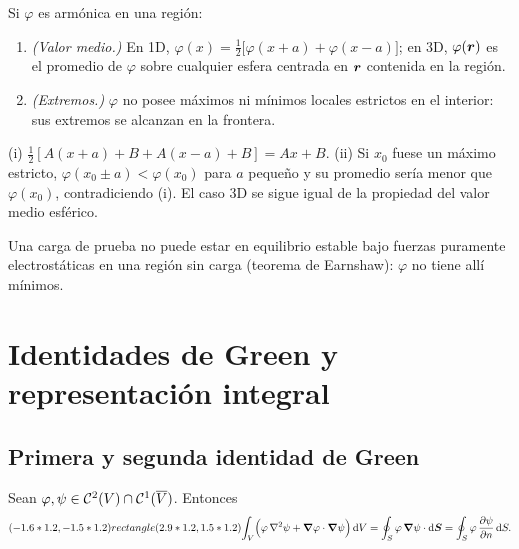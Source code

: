 \documentclass[11pt,a4paper,twoside]{article}
\begin{document}
\begin{proposicion}\label{prop:valormedio}
Si $\varphi$ es armónica en una región:
\begin{enumerate}
  \item \emph{(Valor medio.)} En 1D, $\varphi(x)=\tfrac12\bigl[\varphi(x+a)+\varphi(x-a)\bigr]$;
  en 3D, $\varphi(\bm{r})$ es el promedio de $\varphi$ sobre cualquier esfera centrada en $\bm{r}$
  contenida en la región.
  \item \emph{(Extremos.)} $\varphi$ no posee máximos ni mínimos locales estrictos en el
  interior: sus extremos se alcanzan en la frontera.
\end{enumerate}
\end{proposicion}

\begin{demostracion}[(caso 1D)]
(i) $\tfrac12[A(x+a)+B+A(x-a)+B]=Ax+B$. (ii) Si $x_0$ fuese un máximo estricto,
$\varphi(x_0\pm a)<\varphi(x_0)$ para $a$ pequeño y su promedio sería menor que
$\varphi(x_0)$, contradiciendo (i). El caso 3D se sigue igual de la propiedad del valor medio
esférico.
\end{demostracion}

\begin{observacion}
Una carga de prueba no puede estar en equilibrio estable bajo fuerzas puramente
electrostáticas en una región sin carga (teorema de Earnshaw): $\varphi$ no tiene allí mínimos.
\end{observacion}

\section{Identidades de Green y representación integral}

\subsection{Primera y segunda identidad de Green}

\begin{teorema}\label{teo:green1}
Sean $\varphi,\psi\in\mathcal{C}^{2}(V)\cap\mathcal{C}^{1}(\overline V)$. Entonces
\begin{equation}\label{eq:green1}
  (-1.6*1.2,-1.5*1.2) rectangle (2.9*1.2,1.5*1.2){\int_{V}\Bigl(\varphi\,\nabla^{2}\psi+\bm{\nabla}\varphi\cdot\bm{\nabla}\psi\Bigr)\,\mathrm{d} V
  =\oint_{S}\varphi\,\bm{\nabla}\psi\cdot\mathrm{d}\bm{S}
  =\oint_{S}\varphi\,\frac{\partial \psi}{\partial n}\,\mathrm{d} S .}
\end{equation}
\end{teorema}
\end{document}
